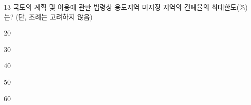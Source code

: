 \begin{question}{13}
국토의 계획 및 이용에 관한 법령상 용도지역 미지정 지역의 건폐율의 최대한도(\%)는? (단, 조례는 고려하지 않음)
\begin{choices}
  \item 20
  \item 30
  \item 40
  \item 50
  \item 60
\end{choices}
\end{question}
